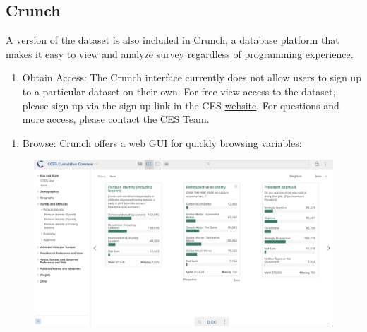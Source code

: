 \documentclass[10pt,article,oneside]{memoir}
\theoremstyle{definition}
\begin{document}
\hypertarget{crunch}{%
\subsection{Crunch}\label{crunch}}

A version of the dataset is also included in Crunch, a database platform
that makes it easy to view and analyze survey regardless of programming
experience.

\begin{enumerate}
\def\labelenumi{\arabic{enumi}.}
\tightlist
\item
  Obtain Access: The Crunch interface currently does not allow users to
  sign up to a particular dataset on their own. For free view access to
  the dataset, please sign up via the sign-up link in the CES
  \href{https://cces.gov.harvard.edu/explore}{website}. For questions
  and more access, please contact the CES Team.
\end{enumerate}

\newpage

\begin{enumerate}
\def\labelenumi{\arabic{enumi}.}
\setcounter{enumi}{1}
\tightlist
\item
  Browse: Crunch offers a web GUI for quickly browsing variables:
\end{enumerate}

\begin{figure}[H]
\centering
\centerline{\includegraphics[width=1.05\linewidth]{01_crunch_browse.png}}
\end{figure}
\end{document}
